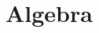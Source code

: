 \documentclass[letterpaper]{article}
\begin{document}
\setcounter{section}{0}
\section{Algebra}

\end{document}
